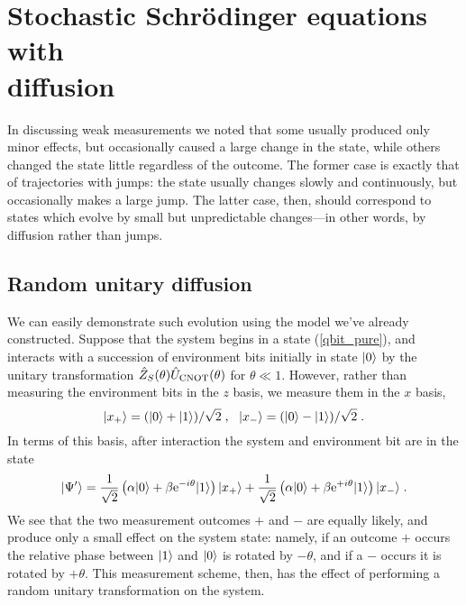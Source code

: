 \section{Stochastic Schr\"odinger equations with \\ diffusion}

In discussing weak measurements we noted that some usually produced only
minor effects, but occasionally caused a large change in the state, while
others changed the state little regardless of the outcome.  The former
case is exactly that of trajectories with jumps:  the state usually
changes slowly and continuously, but occasionally makes a large jump.
The latter case, then, should correspond to states which evolve by small
but unpredictable changes---in other words, by diffusion rather than jumps.

\subsection{Random unitary diffusion}

We can easily demonstrate such evolution using the model we've already
constructed.  Suppose that the system begins in a state
(\ref{qbit_pure}), and interacts with a succession of environment bits
initially in state ${| 0 \rangle}$ by the unitary transformation
${\hat Z}_S(\theta){\hat U}_{\rm CNOT}(\theta)$ for $\theta\ll1$.
However, rather than measuring the environment bits in the $z$ basis,
we measure them in the $x$ basis,
\begin{equation}
\ket{x_+} = (\ket0 + \ket1)/\sqrt2 \;,\ \ 
\ket{x_-} = (\ket0 - \ket1)/\sqrt2 \;.
\end{equation}
In terms of this basis, after interaction the system and environment
bit are in the state
\begin{equation}
{| \Psi' \rangle} = {1\over\sqrt2}\left( \alpha{| 0 \rangle} +
  \beta{\rm e}^{-i\theta}{| 1 \rangle} \right) {| x_+ \rangle} +
  {1\over\sqrt2}\left( \alpha{| 0 \rangle} +
  \beta{\rm e}^{+i\theta}{| 1 \rangle} \right) {| x_- \rangle} \;.
\end{equation}
We see that the two measurement outcomes $+$ and $-$ are equally likely,
and produce only a small effect on the system state:  namely, if an outcome
$+$ occurs the relative phase between ${| 1 \rangle}$ and ${| 0 \rangle}$ is rotated
by $-\theta$, and if a $-$ occurs it is rotated by $+\theta$.  This
measurement scheme, then, has the effect
of performing a random unitary transformation on the system.

